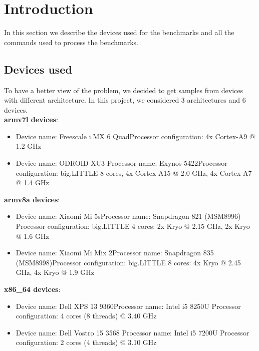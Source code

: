 \section{Introduction}

In this section we describe the devices used for the benchmarks and all the commands used to process the benchmarks.

\subsection{Devices used}

To have a better view of the problem, we decided to get samples from devices with different architecture.
In this project, we considered 3 architectures and 6 devices.\\
\textbf{armv7l devices}:
\begin{itemize}
	\item Device name: Freescale i.MX 6 Quad\newline Processor configuration: 4x Cortex-A9 @ 1.2 GHz
	\item Device name: ODROID-XU3 \newline Processor name: Exynos 5422\newline Processor configuration: big.LITTLE 8 cores, 4x Cortex-A15 @ 2.0 GHz, 4x Cortex-A7 @ 1.4 GHz 
\end{itemize}
\textbf{armv8a devices}:
\begin{itemize}
	\item Device name: Xiaomi Mi 5s\newline Processor name: Snapdragon 821 (MSM8996) \newline Processor configuration: big.LITTLE 4 cores: 2x Kryo @ 2.15 GHz, 2x Kryo @ 1.6 GHz
	\item Device name: Xiaomi Mi Mix 2\newline Processor name: Snapdragon 835 (MSM8998)\newline Processor configuration: big.LITTLE 8 cores: 4x Kryo @ 2.45 GHz, 4x Kryo @ 1.9 GHz
\end{itemize}
\textbf{x86\_64 devices}:
\begin{itemize}
	\item Device name: Dell XPS 13 9360\newline Processor name: Intel i5 8250U \newline Processor configuration: 4 cores (8 threads) @ 3.40 GHz
	\item Device name: Dell Vostro 15 3568 \newline Processor name: Intel i5 7200U
	\newline Processor configuration: 2 cores (4 threads) @ 3.10 GHz
\end{itemize}
\clearpage
